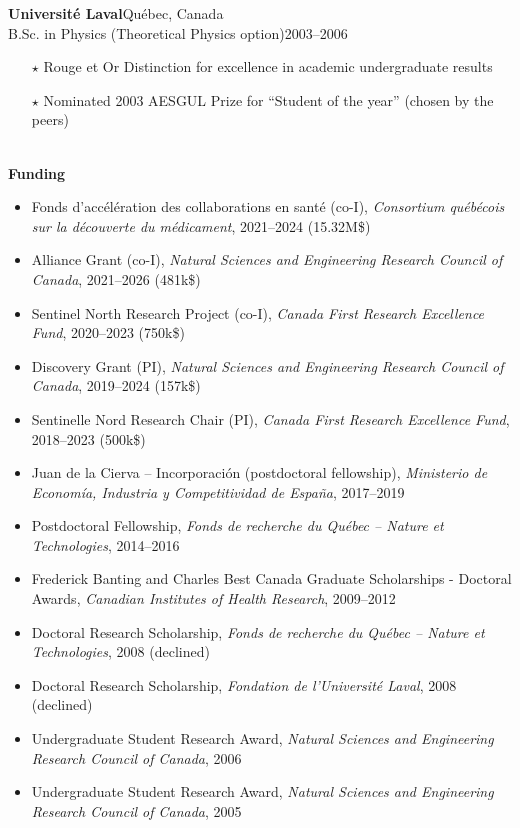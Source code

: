 \documentclass[11pt]{article}
\newcommand{\TitreSection}[1]{\colorbox{background}{\makebox[\textwidth-0.5em][c]{\Large\textrm{\textsc{#1}}}}\vspace{0.75\baselineskip}\\}
\begin{document}
%
\textbf{Universit\'e Laval}\hfill Qu\'ebec, Canada\\
B.Sc. in Physics (Theoretical Physics option)\hfill 2003--2006
\begin{itemize}[leftmargin=1.5em]\small
  \item[$\star$] Rouge et Or Distinction for excellence in academic undergraduate results
  \item[$\star$] Nominated 2003 AESGUL Prize for ``Student of the year'' (chosen by the peers)
\end{itemize}
%
%
%
%
%
\TitreSection{Funding and Awards}
%
\textbf{Funding}
%
\begin{itemize}
  \item Fonds d'accélération des collaborations en santé (co-I), \textit{Consortium québécois sur la découverte du médicament}, 2021--2024 (15.32M\$)
  \item Alliance Grant (co-I), \textit{Natural Sciences and Engineering Research Council of Canada}, 2021--2026 (481k\$)
  \item Sentinel North Research Project (co-I), \textit{Canada First Research Excellence Fund}, 2020--2023 (750k\$)
  \item Discovery Grant (PI), \textit{Natural Sciences and Engineering Research Council of Canada}, 2019--2024 (157k\$)
  \item Sentinelle Nord Research Chair (PI), \textit{Canada First Research Excellence Fund}, 2018--2023 (500k\$)
  \item Juan de la Cierva -- Incorporaci\'on (postdoctoral fellowship), \textit{Ministerio de Econom\'ia, Industria y Competitividad de Espa\~{n}a}, 2017--2019
  \item Postdoctoral Fellowship, \textit{Fonds de recherche du Qu\'ebec -- Nature et Technologies}, 2014--2016
  \item Frederick Banting and Charles Best Canada Graduate Scholarships - Doctoral Awards, \textit{Canadian Institutes of Health Research}, 2009--2012
  \item Doctoral Research Scholarship, \textit{Fonds de recherche du Qu\'ebec -- Nature et Technologies}, 2008 (declined)
  \item Doctoral Research Scholarship, \textit{Fondation de l'Universit\'e Laval}, 2008 (declined)
  \item Undergraduate Student Research Award, \textit{Natural Sciences and Engineering Research Council of Canada}, 2006
  \item Undergraduate Student Research Award, \textit{Natural Sciences and Engineering Research Council of Canada}, 2005
\end{itemize}
\end{document}
